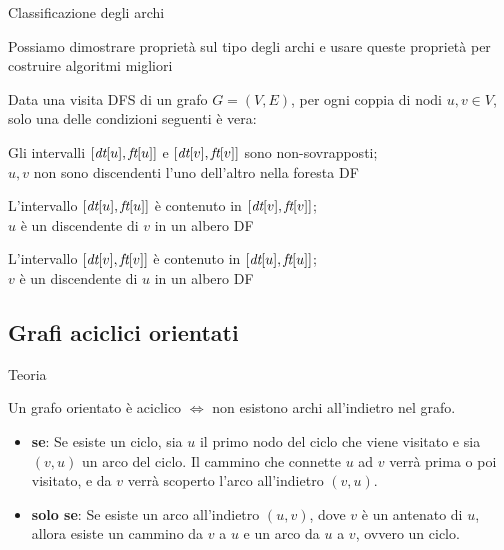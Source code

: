 \begin{frame}{Classificazione degli archi}

\vspace{-9pt}
\begin{myboxtitle}
Possiamo dimostrare proprietà sul tipo degli archi e usare queste proprietà
per costruire algoritmi migliori
\end{myboxtitle}

\begin{myboxtitle}[Teorema]
Data una visita DFS di un grafo  $G=(V,E)$, per ogni coppia di nodi 
$u,v \in V$, solo una delle condizioni seguenti è vera:
\BI 
\item Gli intervalli $[\textit{dt}[u], \textit{ft}[u]]$ e $[\textit{dt}[v], \textit{ft}[v]]$ sono 
non-sovrapposti; \\
\alert{$u,v$ non sono discendenti l'uno dell'altro} nella foresta DF
\item L'intervallo $[\textit{dt}[u], \textit{ft}[u]]$ è contenuto in $[\textit{dt}[v], \textit{ft}[v]]$;\\
\alert{$u$ è un discendente di $v$} in un albero DF
\item L'intervallo $[\textit{dt}[v], \textit{ft}[v]]$ è contenuto in $[\textit{dt}[u], \textit{ft}[u]]$;\\
\alert{$v$ è un discendente di $u$} in un albero DF
\EI
\end{myboxtitle}

\end{frame}


\subsection{Grafi aciclici orientati}


\begin{frame}{Teoria}

\vspace{-9pt}
\begin{myboxtitle}[Teorema]
Un grafo orientato è aciclico $\Leftrightarrow$ non esistono archi all'indietro nel grafo.
\end{myboxtitle}

\begin{myboxtitle}[Dimostrazione]
\begin{itemize}
\item {\bf se}: Se
	esiste un ciclo, sia $u$ il primo nodo del ciclo che viene visitato e sia
	$(v,u)$ un arco del ciclo. Il cammino che connette $u$ ad $v$ verrà prima o
	poi visitato, e da $v$ verrà scoperto l'arco all'indietro $(v,u)$.
\item 
  {\bf solo se}: Se
esiste un arco all'indietro $(u,v)$, dove $v$ è un antenato di $u$, allora
esiste un cammino da $v$ a $u$ e un arco da $u$ a $v$, ovvero un ciclo.
\end{itemize}
\end{myboxtitle}

\end{frame}

